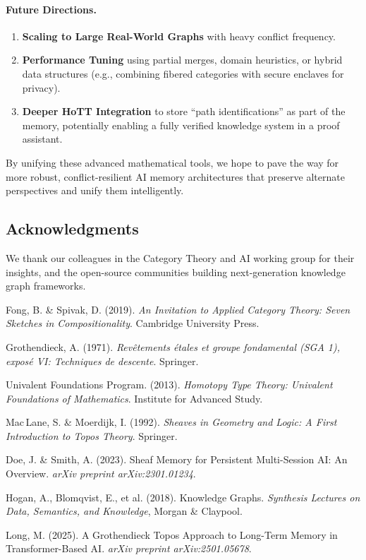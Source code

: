 \documentclass{article}
\begin{document}
\paragraph{Future Directions.}
\begin{enumerate}
    \item \textbf{Scaling to Large Real-World Graphs} with heavy conflict frequency.  
    \item \textbf{Performance Tuning} using partial merges, domain heuristics, or hybrid data structures (e.g., combining fibered categories with secure enclaves for privacy).  
    \item \textbf{Deeper HoTT Integration} to store “path identifications” as part of the memory, potentially enabling a fully verified knowledge system in a proof assistant.  
\end{enumerate}

By unifying these advanced mathematical tools, we hope to pave the way for more robust, conflict-resilient AI memory architectures that preserve alternate perspectives and unify them intelligently.

\subsection*{Acknowledgments}
We thank our colleagues in the Category Theory and AI working group for their insights, and the open-source communities building next-generation knowledge graph frameworks.


\begin{thebibliography}{99}

Fong, B. \& Spivak, D. (2019).
\emph{An Invitation to Applied Category Theory: Seven Sketches in Compositionality}.
Cambridge University Press.

Grothendieck, A. (1971).
\emph{Rev\^{e}tements \'{e}tales et groupe fondamental (SGA 1), expos\'{e} VI: Techniques de descente}.
Springer.

Univalent Foundations Program. (2013).
\emph{Homotopy Type Theory: Univalent Foundations of Mathematics}.
Institute for Advanced Study.

Mac\,Lane, S. \& Moerdijk, I. (1992).
\emph{Sheaves in Geometry and Logic: A First Introduction to Topos Theory}.
Springer.

Doe, J. \& Smith, A. (2023).
Sheaf Memory for Persistent Multi-Session AI: An Overview.
\emph{arXiv preprint arXiv:2301.01234}.

Hogan, A., Blomqvist, E., et al. (2018).
Knowledge Graphs.
\emph{Synthesis Lectures on Data, Semantics, and Knowledge}, Morgan \& Claypool.

Long, M. (2025).
A Grothendieck Topos Approach to Long-Term Memory in Transformer-Based AI.
\emph{arXiv preprint arXiv:2501.05678}.

\end{thebibliography}
\end{document}
